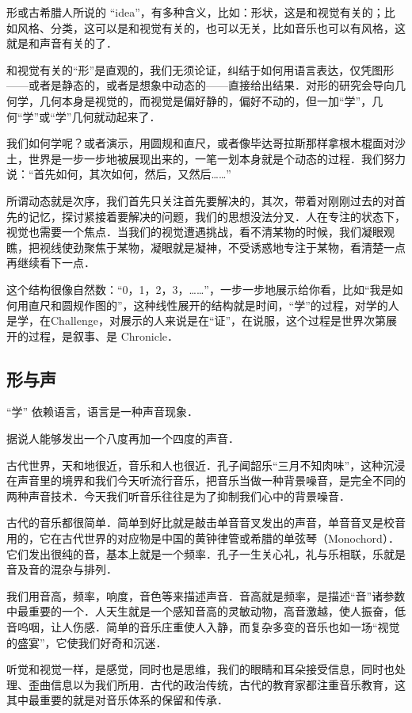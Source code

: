 
形或古希腊人所说的 “idea”，有多种含义，比如：形状，这是和视觉有关的；比如风格、分类，这可以是和视觉有关的，也可以无关，比如音乐也可以有风格，这就是和声音有关的了．

和视觉有关的“形”是直观的，我们无须论证，纠结于如何用语言表达，仅凭图形——或者是静态的，或者是想象中动态的——直接给出结果．对形的研究会导向几何学，几何本身是视觉的，而视觉是偏好静的，偏好不动的，但一加“学”，几何“学”或“学”几何就动起来了．

我们如何学呢？或者演示，用圆规和直尺，或者像毕达哥拉斯那样拿根木棍面对沙土，世界是一步一步地被展现出来的，一笔一划本身就是个动态的过程．我们努力说：“首先如何，其次如何，然后，又然后……”

所谓动态就是次序，我们首先只关注首先要解决的，其次，带着对刚刚过去的对首先的记忆，探讨紧接着要解决的问题，我们的思想没法分叉．人在专注的状态下，视觉也需要一个焦点．当我们的视觉遭遇挑战，看不清某物的时候，我们凝眼观瞧，把视线使劲聚焦于某物，凝眼就是凝神，不受诱惑地专注于某物，看清楚一点再继续看下一点．

这个结构很像自然数：“0，1，2，3，……”，一步一步地展示给你看，比如“我是如何用直尺和圆规作图的”，这种线性展开的结构就是时间，“学”的过程，对学的人是学，在Challenge，对展示的人来说是在“证”，在说服，这个过程是世界次第展开的过程，是叙事、是 Chronicle．

\subsection{形与声}

“学” 依赖语言，语言是一种声音现象．

据说人能够发出一个八度再加一个四度的声音．

古代世界，天和地很近，音乐和人也很近．孔子闻韶乐“三月不知肉味”，这种沉浸在声音里的境界和我们今天听流行音乐，把音乐当做一种背景噪音，是完全不同的两种声音技术．今天我们听音乐往往是为了抑制我们心中的背景噪音．

古代的音乐都很简单．简单到好比就是敲击单音音叉发出的声音，单音音叉是校音用的，它在古代世界的对应物是中国的黄钟律管或希腊的单弦琴（Monochord）．它们发出很纯的音，基本上就是一个频率．孔子一生关心礼，礼与乐相联，乐就是音及音的混杂与排列．

我们用音高，频率，响度，音色等来描述声音．音高就是频率，是描述“音”诸参数中最重要的一个．人天生就是一个感知音高的灵敏动物，高音激越，使人振奋，低音呜咽，让人伤感．简单的音乐庄重使人入静，而复杂多变的音乐也如一场“视觉的盛宴”，它使我们好奇和沉迷．

听觉和视觉一样，是感觉，同时也是思维，我们的眼睛和耳朵接受信息，同时也处理、歪曲信息以为我们所用．古代的政治传统，古代的教育家都注重音乐教育，这其中最重要的就是对音乐体系的保留和传承．

